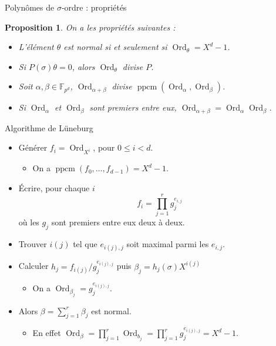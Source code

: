\documentclass[xcolor=x11names,compress]{beamer}
\theoremstyle{break}
\newtheorem{prop}[thm]{Proposition}
\theoremstyle{sc}
\theoremstyle{definition}
\theoremstyle{remark}
\DeclareMathOperator{\Ord}{Ord}
\DeclareMathOperator{\ppcm}{ppcm}
\begin{document}
\begin{frame}{Polynômes de $\sigma$-ordre : propriétés}
  \begin{prop}
   On a les propriétés suivantes :
   \begin{itemize}
     \item L'élément $\theta$ est normal si et seulement si $\Ord_\theta=X^d-1$.
     \item Si $P(\sigma)\theta = 0$, alors $\Ord_\theta$ divise $P$.
     \item Soit $\alpha,\beta\in\mathbb{F}_{p^d}$, $\Ord_{\alpha+\beta}$ divise
       $\ppcm(\Ord_\alpha, \Ord_\beta)$.
     \item Si $\Ord_\alpha$ et $\Ord_\beta$ sont premiers entre eux,
       $\Ord_{\alpha+\beta}=\Ord_\alpha\Ord_\beta$.
   \end{itemize}
  \end{prop}
\end{frame}

\begin{frame}{Algorithme de Lüneburg}
  \begin{itemize}
    \item<1-> Générer $f_i=\Ord_{X^i}$, pour $0\leq i < d$. 
      \begin{itemize}
        \item<2-> On a $\ppcm(f_0, \dots, f_{d-1})=X^d-1$.
      \end{itemize}
    \item<3-> Écrire, pour chaque $i$
      \[
        f_i=\prod_{j=1}^rg_{j}^{e_{i,j}}
      \]
      où les $g_j$ sont premiers entre eux deux à deux.
    \item<4-> Trouver $i(j)$ tel que $e_{i(j),j}$ soit maximal parmi les
      $e_{i,j}$.
    \item<5-> Calculer $h_j=f_{i(j)}/g_j^{e_{i(j),j}}$ puis
      $\beta_j=h_j(\sigma)X^{i(j)}$
      \begin{itemize}
        \item<6-> On a $\Ord_{\beta_j}=g_j^{e_{i(j),j}}$.
      \end{itemize}
    \item<7-> Alors $\beta=\sum_{j=1}^r\beta_j$ est normal.
      \begin{itemize}
        \item<8-> En effet
          $\Ord_\beta=\prod_{j=1}^r\Ord_{b_j}=\prod_{j=1}^rg_j^{e_{i(j),j}}=X^d-1$.
      \end{itemize}
  \end{itemize}
\end{frame}
\end{document}
